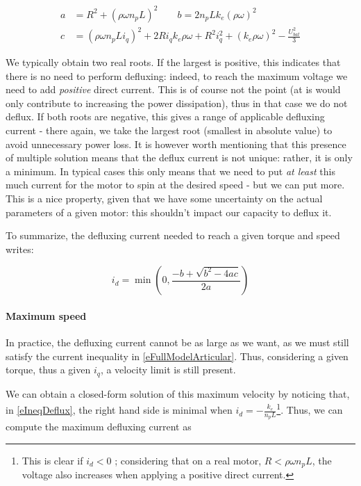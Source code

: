 \documentclass[a4paper,10pt]{article}
\begin{document}
\begin{equation}
	\begin{aligned}
	a &= R^2 + (\rho \omega n_p L)^2 \qquad 
	b = 2 n_p L k_e (\rho \omega)^2 \\ 
	c &= (\rho \omega n_p L i_q)^2 + 2 R i_q k_e \rho \omega + R^2 i_q^2 + (k_e \rho \omega)^2 - \frac{U_{bat}^2}{3}
	\end{aligned}
\end{equation}

We typically obtain two real roots. If the largest is positive, this indicates that there is no need to perform defluxing: indeed, to reach the maximum voltage we need to add \emph{positive} direct current. This is of course not the point (at is would only contribute to increasing the power dissipation), thus in that case we do not deflux. If both roots are negative, this gives a range of applicable defluxing current - there again, we take the largest root (smallest in absolute value) to avoid unnecessary power loss. It is however worth mentioning that this presence of multiple solution means that the deflux current is not unique: rather, it is only a minimum. In typical cases this only means that we need to put \emph{at least} this much current for the motor to spin at the desired speed - but we can put more. This is a nice property, given that we have some uncertainty on the actual parameters of a given motor: this shouldn't impact our capacity to deflux it.

To summarize, the defluxing current needed to reach a given torque and speed writes:

\begin{equation}
	i_d = \min\left(0, \frac{-b + \sqrt{b^2 - 4 a c}}{2 a}\right)
\end{equation} 


\paragraph{Maximum speed}

In practice, the defluxing current cannot be as large as we want, as we must still satisfy the current inequality in \eqref{eFullModelArticular}. Thus, considering a given torque, thus a given $i_q$, a velocity limit is still present. 

We can obtain a closed-form solution of this maximum velocity by noticing that, in \eqref{eIneqDeflux}, the right hand side is minimal when $i_d = -\frac{k_e}{n_p L}$\footnote{This is clear if $i_d < 0$ ; considering that on a real motor, $R < \rho \omega n_p L$, the voltage also increases when applying a positive direct current.}. Thus, we can compute the maximum defluxing current as
\end{document}
